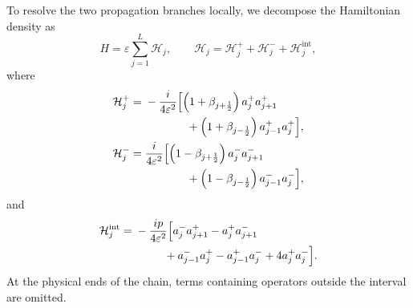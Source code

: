 \documentclass[reprint,amsmath,amssymb,aps,showkeys,superscriptaddress]{revtex4-2}
\begin{document}
To resolve the two propagation branches locally, we decompose the
Hamiltonian density as
\begin{equation}
  H
  =
  \varepsilon\sum_{j=1}^{L}\mathcal{H}_j,
  \qquad
  \mathcal{H}_j
  =
  \mathcal{H}_j^+
  +
  \mathcal{H}_j^-
  +
  \mathcal{H}_j^{\mathrm{int}},
  \label{eq:local_Hamiltonian_decomposition}
\end{equation}
where
\begin{align}
  \mathcal{H}_j^+
  ={}&
  -\frac{i}{4\varepsilon^2}
  \Bigl[
    \left(
      1+\beta_{j+\frac12}
    \right)
    a_j^+a_{j+1}^+
  \nonumber\\
  &\hspace{13mm}
    +
    \left(
      1+\beta_{j-\frac12}
    \right)
    a_{j-1}^+a_j^+
  \Bigr],
  \label{eq:H_density_plus}
  \\
  \mathcal{H}_j^-
  ={}&
  \frac{i}{4\varepsilon^2}
  \Bigl[
    \left(
      1-\beta_{j+\frac12}
    \right)
    a_j^-a_{j+1}^-
  \nonumber\\
  &\hspace{13mm}
    +
    \left(
      1-\beta_{j-\frac12}
    \right)
    a_{j-1}^-a_j^-
  \Bigr],
  \label{eq:H_density_minus}
\end{align}
and
\begin{align}
  \mathcal{H}_j^{\mathrm{int}}
  ={}&
  -\frac{i p}{4\varepsilon^2}
  \Bigl[
    a_j^-a_{j+1}^+
    -
    a_j^+a_{j+1}^-
  \nonumber\\
  &\hspace{9mm}
    +
    a_{j-1}^-a_j^+
    -
    a_{j-1}^+a_j^-
    +
    4a_j^+a_j^-
  \Bigr].
  \label{eq:H_density_interaction}
\end{align}
At the physical ends of the chain, terms containing operators outside
the interval are omitted.
\end{document}
